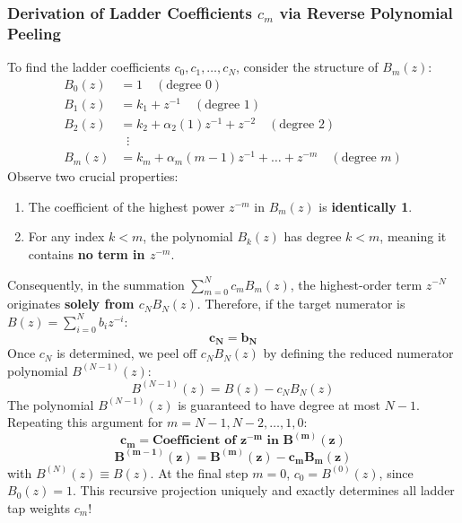 \documentclass[11pt,a4paper]{article}
\begin{document}
\subsubsection{\texorpdfstring{Derivation of Ladder Coefficients $c_m$ via Reverse Polynomial Peeling}{Derivation of Ladder Coefficients cm via Reverse Polynomial Peeling}}
To find the ladder coefficients $c_0, c_1, \dots, c_N$, consider the structure of $B_m(z)$:
\begin{align}
B_0(z) &= 1 \quad (\text{degree } 0) \nonumber \\
B_1(z) &= k_1 + z^{-1} \quad (\text{degree } 1) \nonumber \\
B_2(z) &= k_2 + \alpha_2(1) z^{-1} + z^{-2} \quad (\text{degree } 2) \nonumber \\
&\;\;\vdots \nonumber \\
B_m(z) &= k_m + \alpha_m(m-1) z^{-1} + \dots + z^{-m} \quad (\text{degree } m)
\end{align}
Observe two crucial properties:
\begin{enumerate}
    \item The coefficient of the highest power $z^{-m}$ in $B_m(z)$ is \textbf{identically 1}.
    \item For any index $k < m$, the polynomial $B_k(z)$ has degree $k < m$, meaning it contains \textbf{no term in $z^{-m}$}.
\end{enumerate}
Consequently, in the summation $\sum_{m=0}^N c_m B_m(z)$, the highest-order term $z^{-N}$ originates \textbf{solely from $c_N B_N(z)$}. Therefore, if the target numerator is $B(z) = \sum_{i=0}^N b_i z^{-i}$:
\begin{equation}
\mathbf{c_N = b_N}
\end{equation}
Once $c_N$ is determined, we peel off $c_N B_N(z)$ by defining the reduced numerator polynomial $B^{(N-1)}(z)$:
\begin{equation}
B^{(N-1)}(z) = B(z) - c_N B_N(z)
\end{equation}
The polynomial $B^{(N-1)}(z)$ is guaranteed to have degree at most $N-1$. Repeating this argument for $m = N-1, N-2, \dots, 1, 0$:
\begin{equation}
\mathbf{c_m = \text{Coefficient of } z^{-m} \text{ in } B^{(m)}(z)}
\label{eq:cm_peel}
\end{equation}
\begin{equation}
\mathbf{B^{(m-1)}(z) = B^{(m)}(z) - c_m B_m(z)}
\label{eq:poly_peel}
\end{equation}
with $B^{(N)}(z) \equiv B(z)$. At the final step $m=0$, $c_0 = B^{(0)}(z)$, since $B_0(z) = 1$. This recursive projection uniquely and exactly determines all ladder tap weights $c_m$!
\end{document}

